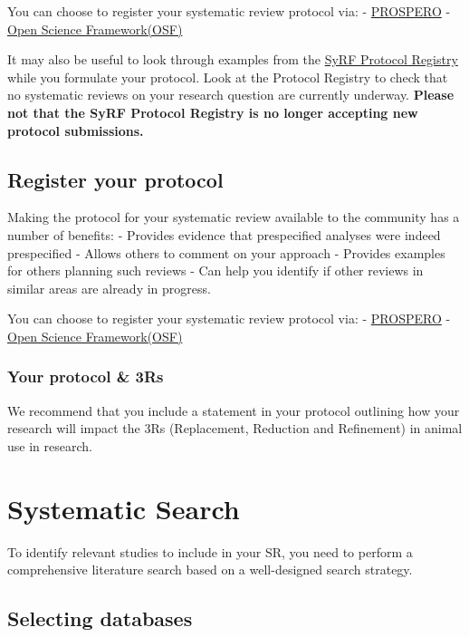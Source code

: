 \documentclass[
]{book}
\begin{document}
You can choose to register your systematic review protocol via:
- \href{https://www.crd.york.ac.uk/prospero/}{PROSPERO}
- \href{https://osf.io/prereg/}{Open Science Framework(OSF)}

It may also be useful to look through examples from the \href{http://syrf.org.uk/protocols/}{SyRF Protocol Registry} while you formulate your protocol. Look at the Protocol Registry to check that no systematic reviews on your research question are currently underway. \textbf{Please not that the SyRF Protocol Registry is no longer accepting new protocol submissions.}

\hypertarget{register-your-protocol-1}{%
\section{Register your protocol}\label{register-your-protocol-1}}

Making the protocol for your systematic review available to the community has a number of benefits:
- Provides evidence that prespecified analyses were indeed prespecified
- Allows others to comment on your approach
- Provides examples for others planning such reviews
- Can help you identify if other reviews in similar areas are already in progress.

You can choose to register your systematic review protocol via:
- \href{https://www.crd.york.ac.uk/prospero/}{PROSPERO}
- \href{https://osf.io/prereg/}{Open Science Framework(OSF)}

\hypertarget{your-protocol-3rs}{%
\subsection{Your protocol \& 3Rs}\label{your-protocol-3rs}}

We recommend that you include a statement in your protocol outlining how your research will impact the 3Rs (Replacement, Reduction and Refinement) in animal use in research.

\hypertarget{systematic-search}{%
\chapter{Systematic Search}\label{systematic-search}}

To identify relevant studies to include in your SR, you need to perform a comprehensive literature search based on a well-designed search strategy.

\hypertarget{selecting-databases}{%
\section{Selecting databases}\label{selecting-databases}}
\end{document}
